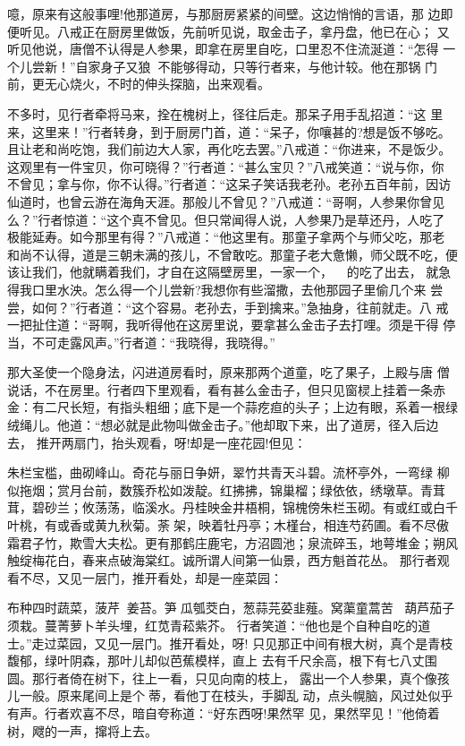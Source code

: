 噫，原来有这般事哩!他那道房，与那厨房紧紧的间壁。这边悄悄的言语，那
边即便听见。八戒正在厨房里做饭，先前听见说，取金击子，拿丹盘，他已在心；
又听见他说，唐僧不认得是人参果，即拿在房里自吃，口里忍不住流涎道：“怎得
一个儿尝新！”自家身子又狼，不能够得动，只等行者来，与他计较。他在那锅
门前，更无心烧火，不时的伸头探脑，出来观看。

不多时，见行者牵将马来，拴在槐树上，径往后走。那呆子用手乱招道：“这
里来，这里来！”行者转身，到于厨房门首，道：“呆子，你嚷甚的?想是饭不够吃。
且让老和尚吃饱，我们前边大人家，再化吃去罢。”八戒道：“你进来，不是饭少。
这观里有一件宝贝，你可晓得？”行者道：“甚么宝贝？”八戒笑道：“说与你，你
不曾见；拿与你，你不认得。”行者道：“这呆子笑话我老孙。老孙五百年前，因访
仙道时，也曾云游在海角天涯。那般儿不曾见？”八戒道：“哥啊，人参果你曾见
么？”行者惊道：“这个真不曾见。但只常闻得人说，人参果乃是草还丹，人吃了
极能延寿。如今那里有得？”八戒道：“他这里有。那童子拿两个与师父吃，那老
和尚不认得，道是三朝未满的孩儿，不曾敢吃。那童子老大惫懒，师父既不吃，便
该让我们，他就瞒着我们，才自在这隔壁房里，一家一个，的吃了出去，
就急得我口里水泱。怎么得一个儿尝新?我想你有些溜撒，去他那园子里偷几个来
尝尝，如何？”行者道：“这个容易。老孙去，手到擒来。”急抽身，往前就走。八
戒一把扯住道：“哥啊，我听得他在这房里说，要拿甚么金击子去打哩。须是干得
停当，不可走露风声。”行者道：“我晓得，我晓得。”

那大圣使一个隐身法，闪进道房看时，原来那两个道童，吃了果子，上殿与唐
僧说话，不在房里。行者四下里观看，看有甚么金击子，但只见窗棂上挂着一条赤
金：有二尺长短，有指头粗细；底下是一个蒜疙疸的头子；上边有眼，系着一根绿
绒绳儿。他道：“想必就是此物叫做金击子。”他却取下来，出了道房，径入后边去，
推开两扇门，抬头观看，呀!却是一座花园!但见：

朱栏宝槛，曲砌峰山。奇花与丽日争妍，翠竹共青天斗碧。流杯亭外，一弯绿
柳似拖烟；赏月台前，数簇乔松如泼靛。红拂拂，锦巢榴；绿依依，绣墩草。青茸
茸，碧砂兰；攸荡荡，临溪水。丹桂映金井梧桐，锦槐傍朱栏玉砌。有或红或白千
叶桃，有或香或黄九秋菊。荼架，映着牡丹亭；木槿台，相连芍药圃。看不尽傲
霜君子竹，欺雪大夫松。更有那鹤庄鹿宅，方沼圆池；泉流碎玉，地萼堆金；朔风
触绽梅花白，春来点破海棠红。诚所谓人间第一仙景，西方魁首花丛。
那行者观看不尽，又见一层门，推开看处，却是一座菜园：

布种四时蔬菜，菠芹姜苔。笋瓜瓠茭白，葱蒜芫荽韭薤。窝蕖童蒿苦，
葫芦茄子须栽。蔓菁萝卜羊头埋，红苋青菘紫芥。
行者笑道：“他也是个自种自吃的道士。”走过菜园，又见一层门。推开看处，呀!
只见那正中间有根大树，真个是青枝馥郁，绿叶阴森，那叶儿却似芭蕉模样，直上
去有千尺余高，根下有七八丈围圆。那行者倚在树下，往上一看，只见向南的枝上，
露出一个人参果，真个像孩儿一般。原来尾间上是个蒂，看他丁在枝头，手脚乱
动，点头幌脑，风过处似乎有声。行者欢喜不尽，暗自夸称道：“好东西呀!果然罕
见，果然罕见！”他倚着树，飕的一声，撺将上去。

